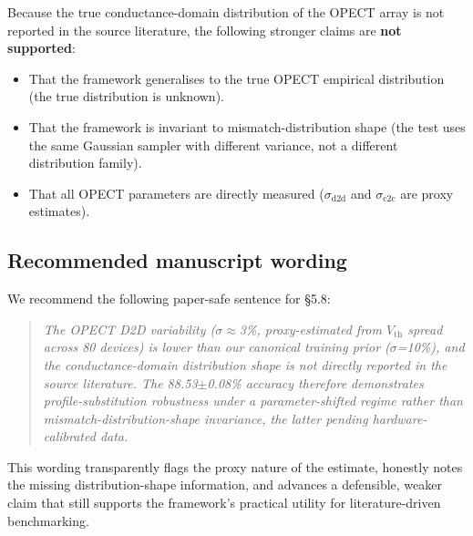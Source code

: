 Because the true conductance-domain distribution of the OPECT array is not reported in the source literature, the following stronger claims are \textbf{not supported}:

\begin{itemize}
\item That the framework generalises to the true OPECT empirical distribution (the true distribution is unknown).
\item That the framework is invariant to mismatch-distribution shape (the test uses the same Gaussian sampler with different variance, not a different distribution family).
\item That all OPECT parameters are directly measured ($\sigma_{\text{d2d}}$ and $\sigma_{\text{c2c}}$ are proxy estimates).
\end{itemize}

\subsection{Recommended manuscript wording}

We recommend the following paper-safe sentence for \S5.8:

\begin{quote}
\textit{The OPECT D2D variability ($\sigma\approx$3\%, proxy-estimated from $V_{\text{th}}$ spread across 80 devices) is lower than our canonical training prior ($\sigma$=10\%), and the conductance-domain distribution shape is not directly reported in the source literature. The 88.53$\pm$0.08\% accuracy therefore demonstrates profile-substitution robustness under a parameter-shifted regime rather than mismatch-distribution-shape invariance, the latter pending hardware-calibrated data.}
\end{quote}

This wording transparently flags the proxy nature of the estimate, honestly notes the missing distribution-shape information, and advances a defensible, weaker claim that still supports the framework's practical utility for literature-driven benchmarking.
